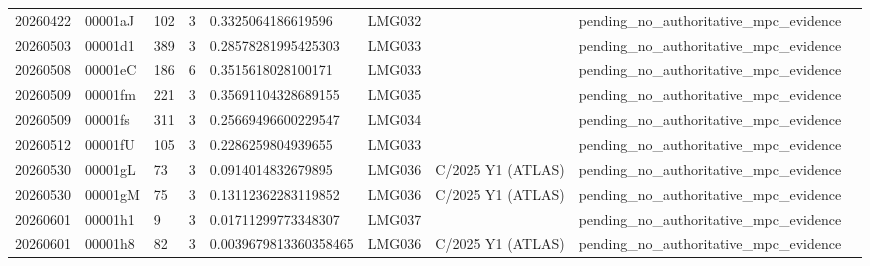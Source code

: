 \begin{longtable}{lllrlllll}
20260422 & 00001aJ & 102 & 3 & 0.3325064186619596 & LMG032 &  & pending\_no\_authoritative\_mpc\_evidence &  \\
20260503 & 00001d1 & 389 & 3 & 0.28578281995425303 & LMG033 &  & pending\_no\_authoritative\_mpc\_evidence &  \\
20260508 & 00001eC & 186 & 6 & 0.3515618028100171 & LMG033 &  & pending\_no\_authoritative\_mpc\_evidence &  \\
20260509 & 00001fm & 221 & 3 & 0.35691104328689155 & LMG035 &  & pending\_no\_authoritative\_mpc\_evidence &  \\
20260509 & 00001fs & 311 & 3 & 0.25669496600229547 & LMG034 &  & pending\_no\_authoritative\_mpc\_evidence &  \\
20260512 & 00001fU & 105 & 3 & 0.2286259804939655 & LMG033 &  & pending\_no\_authoritative\_mpc\_evidence &  \\
20260530 & 00001gL & 73 & 3 & 0.0914014832679895 & LMG036 & C/2025 Y1 (ATLAS) & pending\_no\_authoritative\_mpc\_evidence &  \\
20260530 & 00001gM & 75 & 3 & 0.13112362283119852 & LMG036 & C/2025 Y1 (ATLAS) & pending\_no\_authoritative\_mpc\_evidence &  \\
20260601 & 00001h1 & 9 & 3 & 0.01711299773348307 & LMG037 &  & pending\_no\_authoritative\_mpc\_evidence &  \\
20260601 & 00001h8 & 82 & 3 & 0.0039679813360358465 & LMG036 & C/2025 Y1 (ATLAS) & pending\_no\_authoritative\_mpc\_evidence &  \\
\end{longtable}
